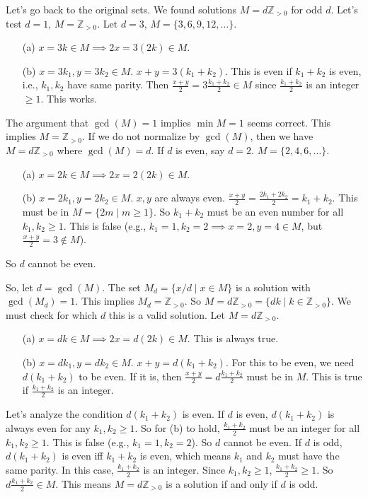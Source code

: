 \documentclass[12pt,a4paper]{article}
\theoremstyle{definition}
\begin{document}
    Let's go back to the original sets. We found solutions $M=d\mathbb{Z}_{>0}$ for odd $d$.
    Let's test $d=1$, $M=\mathbb{Z}_{>0}$.
    Let $d=3$, $M=\{3,6,9,12,\ldots\}$.
    \begin{enumerate}
        \item[(a)] $x=3k \in M \implies 2x=3(2k) \in M$.
        \item[(b)] $x=3k_1, y=3k_2 \in M$. $x+y=3(k_1+k_2)$. This is even if $k_1+k_2$ is even, i.e., $k_1,k_2$ have same parity.
        Then $\frac{x+y}{2} = 3\frac{k_1+k_2}{2} \in M$ since $\frac{k_1+k_2}{2}$ is an integer $\geq 1$. This works.
    \end{enumerate}
    The argument that $\gcd(M)=1$ implies $\min M=1$ seems correct. This implies $M=\mathbb{Z}_{>0}$.
    If we do not normalize by $\gcd(M)$, then we have $M=d\mathbb{Z}_{>0}$ where $\gcd(M)=d$.
    If $d$ is even, say $d=2$. $M=\{2,4,6,\ldots\}$.
    \begin{enumerate}
        \item[(a)] $x=2k \in M \implies 2x=2(2k) \in M$.
        \item[(b)] $x=2k_1, y=2k_2 \in M$. $x,y$ are always even. $\frac{x+y}{2} = \frac{2k_1+2k_2}{2}=k_1+k_2$.
        This must be in $M=\{2m \mid m \geq 1\}$. So $k_1+k_2$ must be an even number for all $k_1,k_2 \geq 1$.
        This is false (e.g., $k_1=1, k_2=2 \implies x=2, y=4 \in M$, but $\frac{x+y}{2}=3 \notin M$).
    \end{enumerate}
    So $d$ cannot be even.

    So, let $d=\gcd(M)$. The set $M_d=\{x/d \mid x \in M\}$ is a solution with $\gcd(M_d)=1$.
    This implies $M_d=\mathbb{Z}_{>0}$.
    So $M = d\mathbb{Z}_{>0} = \{dk \mid k \in \mathbb{Z}_{>0}\}$.
    We must check for which $d$ this is a valid solution.
    Let $M=d\mathbb{Z}_{>0}$.
    \begin{enumerate}
        \item[(a)] $x=dk \in M \implies 2x=d(2k) \in M$. This is always true.
        \item[(b)] $x=dk_1, y=dk_2 \in M$. $x+y=d(k_1+k_2)$. For this to be even, we need $d(k_1+k_2)$ to be even.
        If it is, then $\frac{x+y}{2}=d\frac{k_1+k_2}{2}$ must be in $M$. This is true if $\frac{k_1+k_2}{2}$ is an integer.
    \end{enumerate}
    Let's analyze the condition $d(k_1+k_2)$ is even.
    If $d$ is even, $d(k_1+k_2)$ is always even for any $k_1,k_2 \geq 1$.
    So for (b) to hold, $\frac{k_1+k_2}{2}$ must be an integer for all $k_1,k_2 \geq 1$. This is false (e.g., $k_1=1, k_2=2$).
    So $d$ cannot be even.
    If $d$ is odd, $d(k_1+k_2)$ is even iff $k_1+k_2$ is even, which means $k_1$ and $k_2$ must have the same parity.
    In this case, $\frac{k_1+k_2}{2}$ is an integer. Since $k_1,k_2 \geq 1$, $\frac{k_1+k_2}{2} \geq 1$.
    So $d\frac{k_1+k_2}{2} \in M$.
    This means $M=d\mathbb{Z}_{>0}$ is a solution if and only if $d$ is odd.
\end{document}
